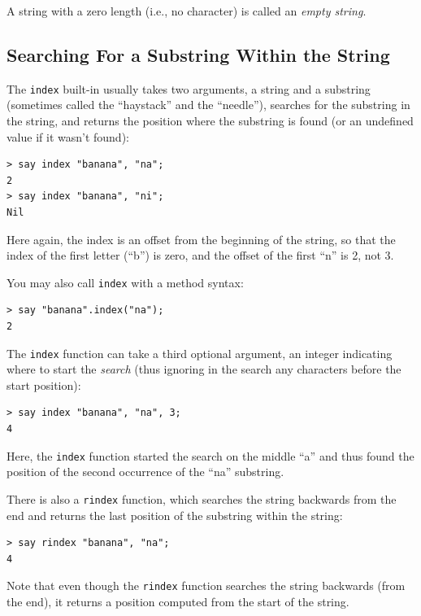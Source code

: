 A string with a zero length (i.e., no character) is called 
an \emph{empty string}.

\subsection{Searching For a Substring Within the String}

\label{find}

The {\tt index} built-in usually takes two arguments, a string 
and a substring (sometimes called the ``haystack'' and the 
``needle''), searches for the substring in the string, and 
returns the position where the substring is found (or an 
undefined value if it wasn't found): 

\begin{verbatim}
> say index "banana", "na";
2
> say index "banana", "ni";
Nil
\end{verbatim}
%

Here again, the index is an offset from the beginning of the 
string, so that the index of the first letter (``b'') is zero, 
and the offset of the first ``n'' is 2, not 3.

You may also call {\tt index} with a method syntax:
\begin{verbatim}
> say "banana".index("na");
2
\end{verbatim}
%

The {\tt index} function can take a third optional argument, 
an integer indicating where to start the \emph{search} 
(thus ignoring in the search any characters before the 
start position):

\begin{verbatim}
> say index "banana", "na", 3;
4
\end{verbatim}
%
Here, the {\tt index} function started the search on the middle 
``a'' and thus found the position of the second occurrence of 
the ``na'' substring.

There is also a {\tt rindex} function, which searches the string 
backwards from the end and returns the last position of the 
substring within the string:

\begin{verbatim}
> say rindex "banana", "na";
4
\end{verbatim}
%

Note that even though the {\tt rindex} function searches the 
string backwards (from the end), it returns a position 
computed from the start of the string.

